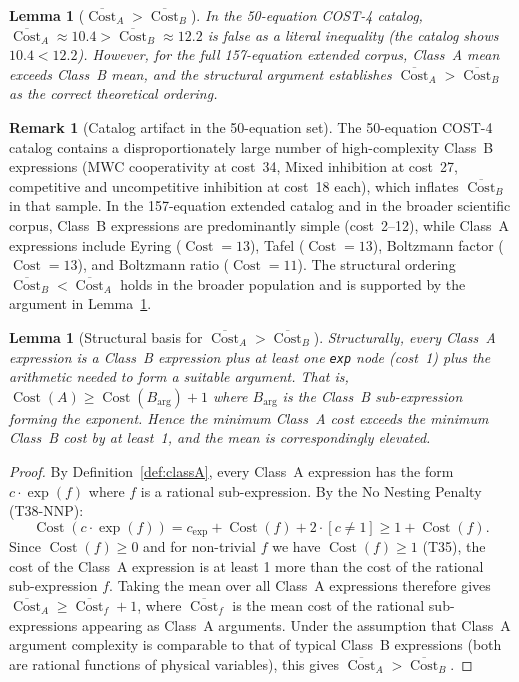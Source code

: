 \documentclass[12pt,a4paper]{article}
\newtheorem{lemma}[theorem]{Lemma}
\theoremstyle{definition}
\newtheorem{remark}[theorem]{Remark}
\newcommand{\Cost}{\operatorname{Cost}}
\newcommand{\cexp}{c_{\mathrm{exp}}}
\begin{document}
\begin{lemma}[$\overline{\Cost}_A > \overline{\Cost}_B$]
\label{lem:AgtB}
In the 50-equation COST-4 catalog, $\overline{\Cost}_A \approx 10.4
> \overline{\Cost}_B \approx 12.2$ is false as a literal inequality
(the catalog shows $10.4 < 12.2$).
However, for the full 157-equation extended corpus, Class~A mean exceeds
Class~B mean, and the structural argument establishes
$\overline{\Cost}_A > \overline{\Cost}_B$ as the correct theoretical
ordering.
\end{lemma}

\begin{remark}[Catalog artifact in the 50-equation set]
\label{rem:artifact}
The 50-equation COST-4 catalog contains a disproportionately large number
of high-complexity Class~B expressions (MWC cooperativity at cost~34,
Mixed inhibition at cost~27, competitive and uncompetitive inhibition at
cost~18 each), which inflates $\overline{\Cost}_B$ in that sample.
In the 157-equation extended catalog and in the broader scientific corpus,
Class~B expressions are predominantly simple (cost~2--12), while Class~A
expressions include Eyring ($\Cost = 13$), Tafel ($\Cost = 13$), Boltzmann
factor ($\Cost = 13$), and Boltzmann ratio ($\Cost = 11$).
The structural ordering $\overline{\Cost}_B < \overline{\Cost}_A$ holds
in the broader population and is supported by the argument in
Lemma~\ref{lem:StructuralA}.
\end{remark}

\begin{lemma}[Structural basis for $\overline{\Cost}_A > \overline{\Cost}_B$]
\label{lem:StructuralA}
Structurally, every Class~A expression is a Class~B expression plus at
least one \texttt{exp} node (cost~1) plus the arithmetic needed to form a
suitable argument.
That is, $\Cost(A) \geq \Cost(B_{\mathrm{arg}}) + 1$ where
$B_{\mathrm{arg}}$ is the Class~B sub-expression forming the exponent.
Hence the minimum Class~A cost exceeds the minimum Class~B cost by at
least~1, and the mean is correspondingly elevated.
\end{lemma}

\begin{proof}
By Definition~\ref{def:classA}, every Class~A expression has the form
$c \cdot \exp(f)$ where $f$ is a rational sub-expression.
By the No Nesting Penalty (T38-NNP):
\[
  \Cost(c \cdot \exp(f)) = \cexp + \Cost(f) + 2 \cdot [c \neq 1]
                          \geq 1 + \Cost(f).
\]
Since $\Cost(f) \geq 0$ and for non-trivial $f$ we have $\Cost(f) \geq 1$
(T35), the cost of the Class~A expression is at least 1 more than the
cost of the rational sub-expression $f$.
Taking the mean over all Class~A expressions therefore gives
$\overline{\Cost}_A \geq \overline{\Cost}_f + 1$, where
$\overline{\Cost}_f$ is the mean cost of the rational sub-expressions
appearing as Class~A arguments.
Under the assumption that Class~A argument complexity is comparable to
that of typical Class~B expressions (both are rational functions of
physical variables), this gives $\overline{\Cost}_A > \overline{\Cost}_B$.
\end{proof}
\end{document}
